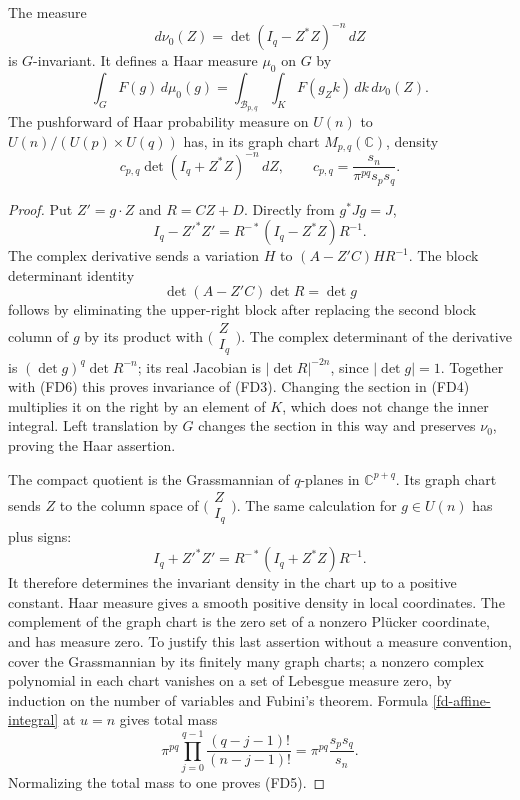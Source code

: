 \begin{lemma}\label{fd-quotient-measure}
The measure
\[
                   d\nu_0(Z)=\det(I_q-Z^*Z)^{-n}\,dZ
 \tag{FD3}
\]
is $G$-invariant. It defines a Haar measure $\mu_0$ on $G$ by
\[
       \int_G F(g)\,d\mu_0(g)
          =\int_{\mathcal B_{p,q}}\int_K F(g_Zk)\,dk\,d\nu_0(Z).
 \tag{FD4}
\]
The pushforward of Haar probability measure on $U(n)$ to
$U(n)/(U(p)\times U(q))$ has, in its graph chart
$M_{p,q}(\mathbb C)$, density
\[
             c_{p,q}\det(I_q+Z^*Z)^{-n}\,dZ,\qquad
             c_{p,q}=\frac{s_n}{\pi^{pq}s_ps_q}.
 \tag{FD5}\label{fd-cpq}
\]
\end{lemma}
\begin{proof}
Put $Z'=g\cdot Z$ and $R=CZ+D$. Directly from $g^*Jg=J$,
\[
                  I_q-Z'^*Z'=R^{-*}(I_q-Z^*Z)R^{-1}.
 \tag{FD6}
\]
The complex derivative sends a variation $H$ to
$(A-Z'C)HR^{-1}$. The block determinant identity
\[
                         \det(A-Z'C)\det R=\det g
\]
follows by eliminating the upper-right block after replacing
the second block column of $g$ by its product with
$\bigl(\begin{smallmatrix}Z\\I_q\end{smallmatrix}\bigr)$.
The complex determinant of the derivative is
$(\det g)^q\det R^{-n}$; its real Jacobian is
$|\det R|^{-2n}$, since $|\det g|=1$.
Together with (FD6) this proves invariance of (FD3).
Changing the section in (FD4) multiplies it on the right by an
element of $K$, which does not change the inner integral.
Left translation by $G$ changes the section in this way and
preserves $\nu_0$, proving the Haar assertion.

The compact quotient is the Grassmannian of $q$-planes
in $\mathbb C^{p+q}$. Its graph chart sends $Z$ to the
column space of $\bigl(\begin{smallmatrix}Z\\I_q\end{smallmatrix}\bigr)$.
The same calculation for $g\in U(n)$ has plus signs:
\[
                   I_q+Z'^*Z'=R^{-*}(I_q+Z^*Z)R^{-1}.
 \tag{FD7}
\]
It therefore determines the invariant density in the chart
up to a positive constant. Haar measure gives a smooth
positive density in local coordinates. The complement of
the graph chart is the zero set of a nonzero Pl\"ucker
coordinate, and has measure zero. To justify this last
assertion without a measure convention, cover the
Grassmannian by its finitely many graph charts; a nonzero
complex polynomial in each chart vanishes on a set of
Lebesgue measure zero, by induction on the number of
variables and Fubini's theorem.
Formula \eqref{fd-affine-integral} at $u=n$ gives total mass
\[
 \pi^{pq}\prod_{j=0}^{q-1}\frac{(q-j-1)!}{(n-j-1)!}
                        =\pi^{pq}\frac{s_ps_q}{s_n}.
\]
Normalizing the total mass to one proves (FD5).
\end{proof}

